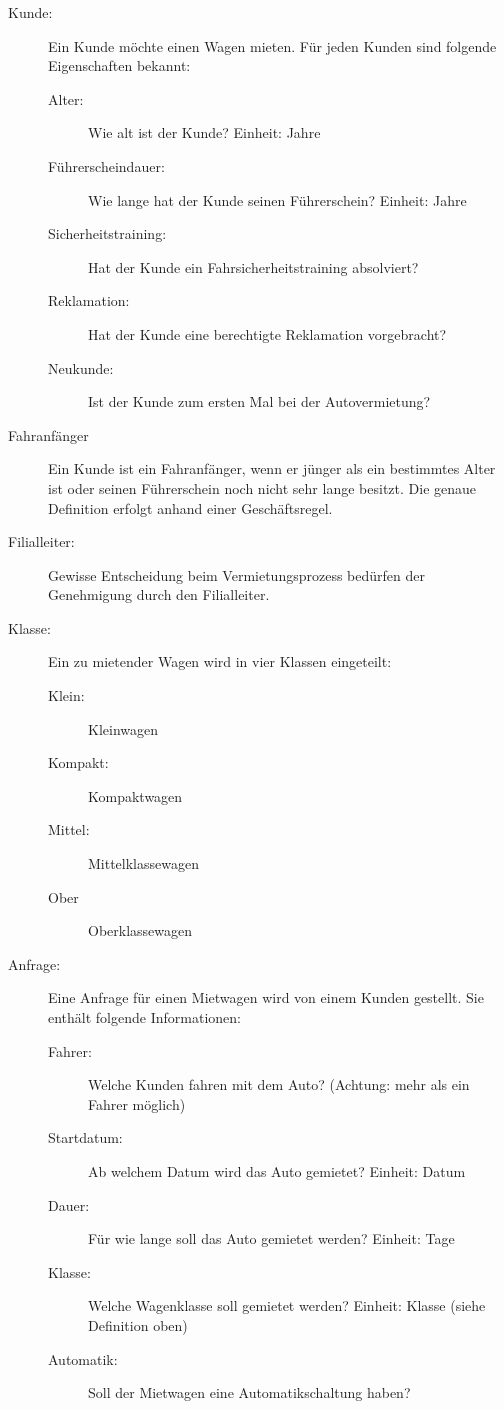 \begin{description}
	\item[Kunde:] Ein Kunde möchte einen Wagen mieten. Für jeden Kunden sind folgende Eigenschaften bekannt:
		\begin{description}
			\item[Alter:] Wie alt ist der Kunde? Einheit: Jahre
			\item[Führerscheindauer:] Wie lange hat der Kunde seinen Führerschein? Einheit: Jahre
			\item[Sicherheitstraining:] Hat der Kunde ein Fahrsicherheitstraining absolviert?
			\item[Reklamation:] Hat der Kunde eine berechtigte Reklamation vorgebracht?
			\item[Neukunde:] Ist der Kunde zum ersten Mal bei der Autovermietung?
		\end{description}
	\item[Fahranfänger] Ein Kunde ist ein Fahranfänger, wenn er jünger als ein bestimmtes Alter ist oder
		seinen Führerschein noch nicht sehr lange besitzt. Die genaue Definition erfolgt anhand einer
		Geschäftsregel.	
	\item[Filialleiter:] Gewisse Entscheidung beim Vermietungsprozess bedürfen der Genehmigung durch
		den Filialleiter.
	\item[Klasse:] Ein zu mietender Wagen wird in vier Klassen eingeteilt:
		\begin{description}
			\item[Klein:] Kleinwagen
			\item[Kompakt:] Kompaktwagen
			\item[Mittel:] Mittelklassewagen
			\item[Ober] Oberklassewagen
		\end{description}
	\item[Anfrage:] Eine Anfrage für einen Mietwagen wird von einem Kunden gestellt. Sie enthält folgende Informationen:
		\begin{description}
			\item[Fahrer:] Welche Kunden fahren mit dem Auto? (Achtung: mehr als ein Fahrer möglich)
			\item[Startdatum:] Ab welchem Datum wird das Auto gemietet? Einheit: Datum
			\item[Dauer:] Für wie lange soll das Auto gemietet werden? Einheit: Tage
			\item[Klasse:] Welche Wagenklasse soll gemietet werden? Einheit: Klasse (siehe Definition oben)
			\item[Automatik:] Soll der Mietwagen eine Automatikschaltung haben?

\end{description}
\end{description}
